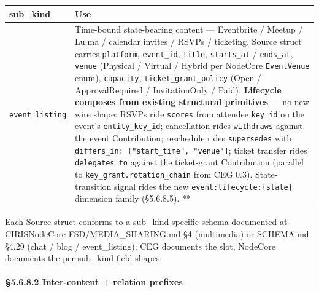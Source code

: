 \documentclass[11pt]{article}
\begin{document}
{\footnotesize
\begin{longtable}{|p{8.0cm}|p{8.0cm}|}\hline
\textbf{sub\_kind} & \textbf{Use} \\ \hline\endhead
\texttt{event\_listing} & Time-bound state-bearing content — Eventbrite / Meetup / Lu.ma / calendar invites / RSVPs / ticketing. Source struct carries \texttt{platform}, \texttt{event\_id}, \texttt{title}, \texttt{starts\_at} / \texttt{ends\_at}, \texttt{venue} (Physical / Virtual / Hybrid per NodeCore \texttt{EventVenue} enum), \texttt{capacity}, \texttt{ticket\_grant\_policy} (Open / ApprovalRequired / InvitationOnly / Paid). \textbf{Lifecycle composes from existing structural primitives} — no new wire shape: RSVPs ride \texttt{scores} from attendee \texttt{key\_id} on the event's \texttt{entity\_key\_id}; cancellation rides \texttt{withdraws} against the event Contribution; reschedule rides \texttt{supersedes} with \texttt{differs\_in: ["start\_time", "venue"]}; ticket transfer rides \texttt{delegates\_to} against the ticket-grant Contribution (parallel to \texttt{key\_grant.rotation\_chain} from CEG 0.3). State-transition signal rides the new \texttt{event:lifecycle:\{state\}} dimension family (§5.6.8.5). ** \\ \hline
\end{longtable}}


Each Source struct conforms to a sub\_kind-specific schema documented at CIRISNodeCore FSD/MEDIA\_SHARING.md §4 (multimedia) or SCHEMA.md §4.29 (chat / blog / event\_listing); CEG documents the slot, NodeCore documents the per-sub\_kind field shapes.


\paragraph{§5.6.8.2 Inter-content + relation prefixes}\mbox{}\\
\end{document}
